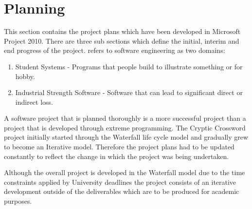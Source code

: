 \section{Planning}
\label{sec:planning}

This section contains the project plans which have been developed in Microsoft
Project 2010. There are three sub sections which define the initial, interim and
end progress of the project. \citet{planning05} refers to software engineering
as two domains:

\begin{enumerate}
  \item Student Systems - Programs that people build to illustrate something or 
        for hobby.
  \item Industrial Strength Software - Software that can lead to significant 
        direct or indirect loss.
\end{enumerate}

A software project that is planned thoroughly is a more successful project than
a project that is developed through extreme programming. The Cryptic Crossword
project initially started through the Waterfall life cycle model and gradually
grew to become an Iterative model. Therefore the project plans had to be updated
constantly to reflect the change in which the project was being undertaken.

Although the overall project is developed in the Waterfall model due to the time
constraints applied by University deadlines the project consists of an iterative
development outside of the deliverables which are to be produced for academic
purposes.


